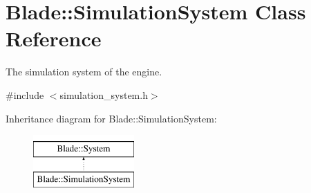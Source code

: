 \hypertarget{class_blade_1_1_simulation_system}{}\section{Blade\+:\+:Simulation\+System Class Reference}
\label{class_blade_1_1_simulation_system}


The simulation system of the engine.  




{\ttfamily \#include $<$simulation\+\_\+system.\+h$>$}

Inheritance diagram for Blade\+:\+:Simulation\+System\+:\begin{figure}[H]
\begin{center}
\leavevmode
\includegraphics[height=2.000000cm]{class_blade_1_1_simulation_system}
\end{center}
\end{figure}
